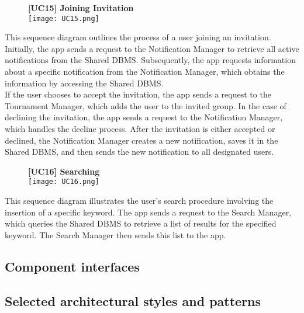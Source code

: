 \documentclass{article}
\begin{document}
\begin{figure}[H]
    \centering
    \textbf{[UC15] Joining Invitation} \\
    \texttt{[image: UC15.png]}
\end{figure}
\noindent
This sequence diagram outlines the process of a user joining an invitation. Initially, the app sends a request to the Notification Manager to retrieve all active notifications from the Shared DBMS. Subsequently, the app requests information about a specific notification from the Notification Manager, which obtains the information by accessing the Shared DBMS. \\
If the user chooses to accept the invitation, the app sends a request to the Tournament Manager, which adds the user to the invited group. In the case of declining the invitation, the app sends a request to the Notification Manager, which handles the decline process. After the invitation is either accepted or declined, the Notification Manager creates a new notification, saves it in the Shared DBMS, and then sends the new notification to all designated users.

\begin{figure}[H]
    \centering
    \textbf{[UC16] Searching} \\
    \texttt{[image: UC16.png]}
\end{figure}
\noindent
This sequence diagram illustrates the user's search procedure involving the insertion of a specific keyword. The app sends a request to the Search Manager, which queries the Shared DBMS to retrieve a list of results for the specified keyword. The Search Manager then sends this list to the app.

\subsection{Component interfaces}

\subsection{Selected architectural styles and patterns}
\end{document}
